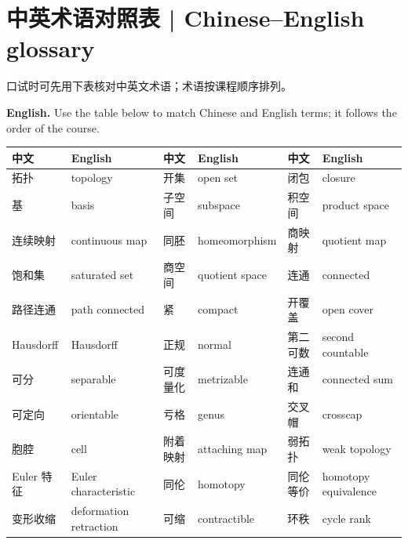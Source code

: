 \documentclass[UTF8,11pt,a4paper]{ctexart}
\newcommand{\EN}[1]{\par\noindent\textbf{English.} #1\par}
\begin{document}
\section*{中英术语对照表 | Chinese--English glossary}
\noindent 口试时可先用下表核对中英文术语；术语按课程顺序排列。
\EN{Use the table below to match Chinese and English terms; it follows the order of the course.}
{\footnotesize
\begin{center}
\setlength{\tabcolsep}{3pt}
\begin{tabular}{p{1.75cm}p{3.3cm}p{1.75cm}p{3.3cm}p{1.75cm}p{3.3cm}}
\toprule
\textbf{中文} & \textbf{English} & \textbf{中文} & \textbf{English} & \textbf{中文} & \textbf{English}\\
\midrule
拓扑 & topology & 开集 & open set & 闭包 & closure\\
基 & basis & 子空间 & subspace & 积空间 & product space\\
连续映射 & continuous map & 同胚 & homeomorphism & 商映射 & quotient map\\
饱和集 & saturated set & 商空间 & quotient space & 连通 & connected\\
路径连通 & path connected & 紧 & compact & 开覆盖 & open cover\\
Hausdorff & Hausdorff & 正规 & normal & 第二可数 & second countable\\
可分 & separable & 可度量化 & metrizable & 连通和 & connected sum\\
可定向 & orientable & 亏格 & genus & 交叉帽 & crosscap\\
胞腔 & cell & 附着映射 & attaching map & 弱拓扑 & weak topology\\
Euler 特征 & Euler characteristic & 同伦 & homotopy & 同伦等价 & homotopy equivalence\\
变形收缩 & deformation retraction & 可缩 & contractible & 环秩 & cycle rank\\
\bottomrule
\end{tabular}
\end{center}
}
\end{document}
